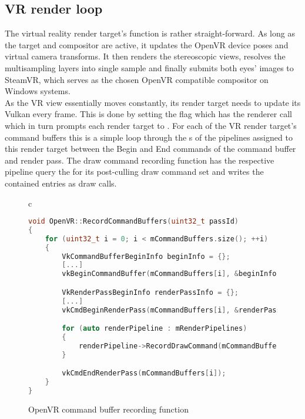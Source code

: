 \subsection{VR render loop}
The virtual reality render target's  function is rather straight-forward. 
As long as the target and compositor are active, it updates the OpenVR device poses and virtual camera transforms. It then renders the stereoscopic views, resolves the multisampling layers into single sample and finally submits both eyes' images to SteamVR, which serves as the chosen OpenVR compatible compositor on Windows systems. \\

As the VR view essentially moves constantly, its render target needs to update its Vulkan  every frame. This is done by setting the  flag which has the renderer call  which in turn prompts each render target to . For each of the VR render target's command buffers this is a simple loop through the s of the pipelines assigned to this render target between the Begin and End commands of the command buffer and render pass. The draw command recording function has the respective pipeline query the  for its post-culling draw command set and writes the contained entries as  draw calls. 

\begin{figure}[htpb]
  \centering
  \begin{tabular}{c}
  \begin{lstlisting}[language=C++]
  void OpenVR::RecordCommandBuffers(uint32_t passId)
{
	for (uint32_t i = 0; i < mCommandBuffers.size(); ++i)
	{
		VkCommandBufferBeginInfo beginInfo = {};
		[...]
		vkBeginCommandBuffer(mCommandBuffers[i], &beginInfo);

		VkRenderPassBeginInfo renderPassInfo = {};
		[...]
		vkCmdBeginRenderPass(mCommandBuffers[i], &renderPassInfo, VK_SUBPASS_CONTENTS_INLINE);

		for (auto renderPipeline : mRenderPipelines)
		{
			renderPipeline->RecordDrawCommand(mCommandBuffers[i], passId);
		}

		vkCmdEndRenderPass(mCommandBuffers[i]);
	}
}
	\end{lstlisting}
  \end{tabular}
  \caption[OpenVR render target's RecordCommandBuffers]{OpenVR command buffer recording function}\label{fig:lst_OpenVR_RecordCommandBuffers}
\end{figure}

